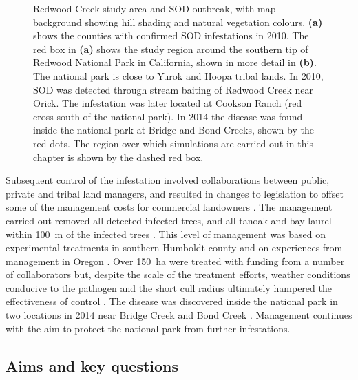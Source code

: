 \begin{figure}[t]
    \begin{center}
        \caption[Redwood Creek study area and SOD outbreak]{Redwood Creek study area and SOD outbreak, with map background showing hill shading and natural vegetation colours. \textbf{(a)} shows the counties with confirmed SOD infestations in 2010. The red box in \textbf{(a)} shows the study region around the southern tip of Redwood National Park in California, shown in more detail in \textbf{(b)}. The national park is close to Yurok and Hoopa tribal lands. In 2010, SOD was detected through stream baiting of Redwood Creek near Orick. The infestation was later located at Cookson Ranch (red cross south of the national park). In 2014 the disease was found inside the national park at Bridge and Bond Creeks, shown by the red dots. The region over which simulations are carried out in this chapter is shown by the dashed red box.\label{fig:ch7:map}}
    \end{center}
\end{figure}

Subsequent control of the infestation involved collaborations between public, private and tribal land managers, and resulted in changes to legislation to offset some of the management costs for commercial landowners \citep{valachovic_novel_2013}. The management carried out removed all detected infected trees, and all tanoak and bay laurel within \SI{100}{\meter} of the infected trees \citep{valachovic_novel_2013}. This level of management was based on experimental treatments in southern Humboldt county \citep{valachovic_forest_2010, valachovic_suppression_2013} and on experiences from management in Oregon \citep{goheen_eradication_2010}. Over \SI{150}{\hectare} were treated with funding from a number of collaborators but, despite the scale of the treatment efforts, weather conditions conducive to the pathogen and the short cull radius ultimately hampered the effectiveness of control \citep{valachovic_novel_2013}. The disease was discovered inside the national park in two locations in 2014 near Bridge Creek and Bond Creek \citep{stark_sudden_2014}. Management continues with the aim to protect the national park from further infestations.

\subsection{Aims and key questions}

